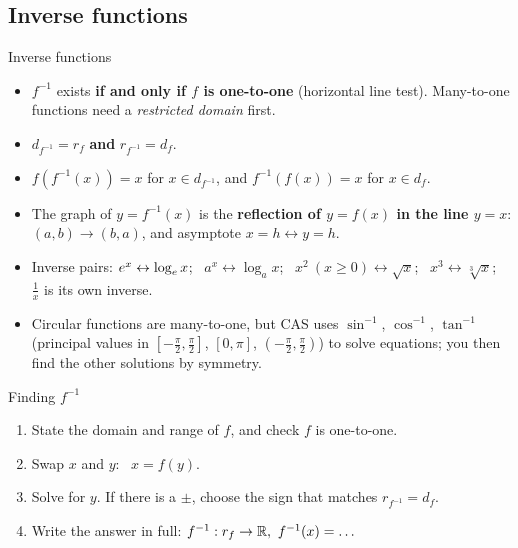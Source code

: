\subsection{Inverse functions}
\label{sec:inverse}

\begin{keyres}{Inverse functions}
\begin{itemize}
  \item $f^{-1}$ exists \textbf{if and only if $f$ is one-to-one} (horizontal line test). Many-to-one functions need a \emph{restricted domain} first.
  \item \boldmath$d_{f^{-1}}=r_f$ \textbf{and} $r_{f^{-1}}=d_f$.\unboldmath
  \item $f\!\left(f^{-1}(x)\right)=x$ for $x\in d_{f^{-1}}$, and $f^{-1}(f(x))=x$ for $x\in d_f$.
  \item The graph of $y=f^{-1}(x)$ is the \textbf{reflection of $y=f(x)$ in the line $y=x$}: $(a,b)\to(b,a)$, and asymptote $x=h\leftrightarrow y=h$.
  \item Inverse pairs: $e^x\leftrightarrow\log_e x$; \ $a^x\leftrightarrow\log_ax$; \ $x^2\ (x\ge0)\leftrightarrow\sqrt{x}$; \ $x^3\leftrightarrow\sqrt[3]{x}$; \ $\frac1x$ is its own inverse.
  \item Circular functions are many-to-one, but CAS uses $\sin^{-1}$, $\cos^{-1}$, $\tan^{-1}$ (principal values in $\left[-\frac\pi2,\frac\pi2\right]$, $[0,\pi]$, $\left(-\frac\pi2,\frac\pi2\right)$) to solve equations; you then find the other solutions by symmetry.
\end{itemize}
\end{keyres}

\begin{method}{Finding $f^{-1}$}
\begin{enumerate}
  \item State the domain and range of $f$, and check $f$ is one-to-one.
  \item Swap $x$ and $y$: \ $x=f(y)$.
  \item Solve for $y$. If there is a $\pm$, choose the sign that matches $r_{f^{-1}}=d_f$.
  \item Write the answer in full: $f^{-1}:r_f\to\mathbb{R},\ f^{-1}(x)=\dots$
\end{enumerate}
\end{method}

